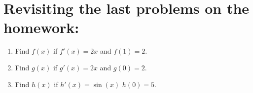 \documentclass{article}[12pt]
\theoremstyle{definition}
\theoremstyle{example}
\theoremstyle{theorem}
\begin{document}
\section{Revisiting the last problems on the homework:}
\begin{enumerate}
        \item Find $f(x)$ if $f'(x)=2x$ and $f(1)=2$. 
        \vspace{2cm}
        \item Find $g(x)$ if $g'(x)=2x$ and $g(0)=2$. 
        \vspace{2cm}
        \item Find $h(x)$ if $h'(x)=\sin(x)$ $h(0)=5$.
        \vspace{2cm}
\end{enumerate}
\end{document}
